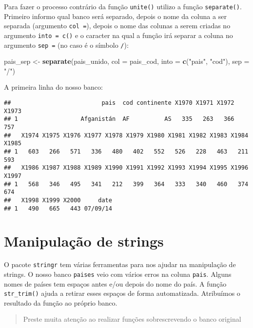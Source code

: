 \documentclass[]{book}
\newenvironment{Shaded}{\begin{snugshade}}{\end{snugshade}}
\newcommand{\DataTypeTok}[1]{\textcolor[rgb]{0.13,0.29,0.53}{#1}}
\newcommand{\KeywordTok}[1]{\textcolor[rgb]{0.13,0.29,0.53}{\textbf{#1}}}
\newcommand{\NormalTok}[1]{#1}
\newcommand{\StringTok}[1]{\textcolor[rgb]{0.31,0.60,0.02}{#1}}
\theoremstyle{definition}
\theoremstyle{definition}
\theoremstyle{definition}
\theoremstyle{remark}
\begin{document}
Para fazer o processo contrário da função \texttt{unite()} utilizo a função \texttt{separate()}. Primeiro informo qual banco será separado, depois o nome da coluna a ser separada (argumento \texttt{col\ =}), depois o nome das colunas a serem criadas no argumento \texttt{into\ =\ c()} e o caracter na qual a função irá separar a coluna no argumento \texttt{sep\ =} (no caso é o símbolo \texttt{/}):

\begin{Shaded}
\begin{Highlighting}[]
\NormalTok{pais_sep <-}\StringTok{ }\KeywordTok{separate}\NormalTok{(pais_unido, }\DataTypeTok{col =}\NormalTok{ pais_cod, }\DataTypeTok{into =} \KeywordTok{c}\NormalTok{(}\StringTok{"pais"}\NormalTok{, }\StringTok{"cod"}\NormalTok{), }\DataTypeTok{sep =} \StringTok{"/"}\NormalTok{)}
\end{Highlighting}
\end{Shaded}

A primeira linha do nosso banco:

\begin{verbatim}
##                          pais  cod continente X1970 X1971 X1972 X1973
## 1                  Afganistán  AF          AS   335   263   366   757
##   X1974 X1975 X1976 X1977 X1978 X1979 X1980 X1981 X1982 X1983 X1984 X1985
## 1   603   266   571   336   480   402   552   526   228   463   211   593
##   X1986 X1987 X1988 X1989 X1990 X1991 X1992 X1993 X1994 X1995 X1996 X1997
## 1   568   346   495   341   212   399   364   333   340   460   374   674
##   X1998 X1999 X2000     date
## 1   490   665   443 07/09/14
\end{verbatim}

\hypertarget{manipulauxe7uxe3o-de-strings}{%
\section{Manipulação de strings}\label{manipulauxe7uxe3o-de-strings}}

O pacote \texttt{stringr} tem várias ferramentas para nos ajudar na manipulação de strings. O nosso banco \texttt{paises} veio com vários erros na coluna \texttt{pais}. Alguns nomes de países tem espaços antes e/ou depois do nome do país. A função \texttt{str\_trim()} ajuda a retirar esses espaços de forma automatizada. Atribuímos o resultado da função ao próprio banco.

\begin{quote}
Preste muita atenção ao realizar funções sobrescrevendo o banco original
\end{quote}
\end{document}
